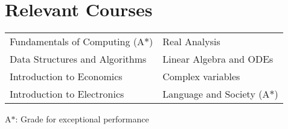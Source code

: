\section*{\sc Relevant Courses}
\vspace{-2mm}
\hrulefill
\vspace{1mm}

\begin{tabular}{ l l }
Fundamentals of Computing (A$*$) & Real Analysis \\
Data Structures and Algorithms & Linear Algebra and ODEs \\
Introduction to Economics  & Complex variables \\ 
Introduction to Electronics & Language and Society (A$*$) \\ 
\end{tabular}

{\small{A$*$: Grade for exceptional performance}}